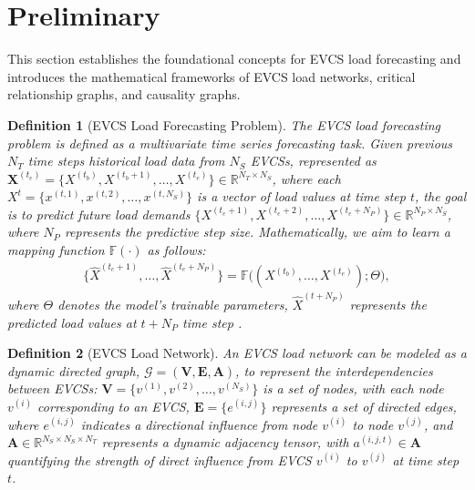 \documentclass[lettersize,journal]{IEEEtran}
\newtheorem{definition}{\textbf{Definition}}[section]
\begin{document}
\vspace{-6pt}
\section{Preliminary}
\label{section:problem}

This section establishes the foundational concepts for EVCS load forecasting and introduces the mathematical frameworks of EVCS load networks, critical relationship graphs, and causality graphs. 

\begin{definition}[EVCS Load Forecasting Problem]
	The EVCS load forecasting problem is defined as a multivariate time series forecasting task.  Given previous $N_T$ time steps historical load data from $N_S$ EVCSs, represented as  $\bm{X}^{(t_{e})} = \{X^{(t_{b})}, X^{(t_{b}+1)}, \dots, X^{(t_{e})} \} \in \mathbb{R}^{N_T \times N_S}$, where each $X^t = \{ x^{(t,1)}, x^{(t,2)}, \dots, x^{(t, N_S)} \}$ is a vector of load values at time step $t$, the goal is to predict future load demands $\{X^{(t_{e}+1)}, X^{(t_{e}+2)}, \ldots, X^{(t_{e}+N_P)} \} \in \mathbb{R}^{N_P \times N_S}$, where $N_P$ represents the predictive step size. Mathematically, we aim to learn a mapping function $\mathbb{F}(\cdot)$ as follows:
	\begin{equation}
		\begin{aligned}
			\{\hat{X}^{(t_{e}+1)}, \ldots, \hat{X}^{(t_{e}+N_P)} \} = \mathbb{F}\big((X^{(t_{b})}, \ldots, X^{(t_{e})}); \Theta \big),
		\end{aligned}
		\label{eq:forecast_function}
	\end{equation}
	where $\Theta$ denotes the model's trainable parameters,  $\hat{X}^{(t+N_P)}$ represents the predicted load values at $t+N_P$ time step .
\end{definition}

\begin{definition}[EVCS Load Network]
	An EVCS load network can be modeled as a dynamic directed graph, $\bm{\mathcal{G}} = (\bm{V}, \bm{E}, \bm{A})$, to represent the interdependencies between EVCSs:
	$\bm{V} = \{v^{(1)}, v^{(2)},  \dots, v^{(N_S)}\}$ is a set of nodes, with each node $v^{(i)}$ corresponding to an EVCS, $\bm{E} = \{e^{(i, j)}\}$ represents a set of directed edges, where  $e^{(i, j)}$ indicates a directional influence from node $v^{(i)}$ to node $v^{(j)}$, and  $\bm{A} \in \mathbb{R}^{N_S \times N_S \times N_T}$ represents a dynamic adjacency tensor, with $a^{(i, j, t)} \in \bm{A}$ quantifying the strength of direct influence from EVCS $v^{(i)}$ to $v^{(j)}$ at time step $t$. 
\end{definition}
\end{document}

